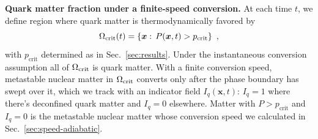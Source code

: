 \documentclass[10pt,superscriptaddress,
amsmath,aps,prc,twocolumn,nofootinbib,floatfix]{revtex4-1}
\begin{document}
{\textbf{Quark matter fraction under a finite-speed conversion.}
At each time $t$, we define region where quark matter is thermodynamically favored by
\begin{equation}
\Omega_{\rm crit}(t)
=\left\{\boldsymbol{x}:\,P(\boldsymbol{x},t)>p_\text{crit}\right\}\ ,
\label{eq:critical_region}
\end{equation}
with $p_\text{crit}$ determined as in Sec.~\ref{sec:results}.
Under the instantaneous conversion assumption all of $\Omega_{\rm crit}$ is quark matter.
With a finite conversion speed, metastable nuclear matter in $\Omega_{\rm crit}$ converts only after the phase boundary has swept over it, which we track with an indicator field $I_q(\boldsymbol{x},t)$: $I_q=1$ where there's deconfined quark matter and $I_q=0$ elsewhere.
Matter with $P>p_\text{crit}$ and $I_q=0$ is the metastable nuclear matter whose conversion speed we calculated in Sec.~\ref{sec:speed-adiabatic}.


}
\end{document}
